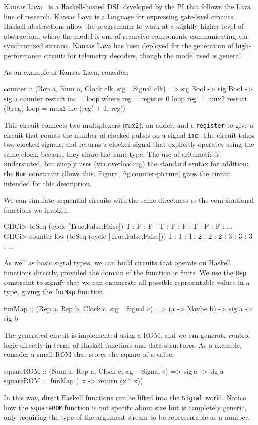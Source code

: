 \documentclass[11pt]{article}
\begin{document}
Kansas Lava~\cite{Gill:13:TypesKansasLava} is a Haskell-hosted DSL developed by the PI
that follows the Lava line of research.
Kansas Lava is a language for expressing gate-level circuits.
Haskell abstractions allow the programmer to work at
a slightly higher level of abstraction, where the model
is one of recursive components communicating via synchronized streams.
Kansas Lava has been deployed for the generation of high-performance circuits for telemetry decoders,
though the model used is general.

As an example of Kansas Lava, consider:

\begin{Code}

counter :: (Rep a, Num a, Clock clk, sig ~ Signal clk) => sig Bool -> sig Bool -> sig a
counter restart inc = loop
   where reg = register 0 loop
	 reg' = mux2 restart (0,reg)
	 loop = mux2 inc (reg' + 1, reg')
\end{Code}

This circuit connects two multiplexers (\verb|mux2|),
an adder,
and a \verb|register|
to give a circuit that counts the number of
clocked pulses on a signal \verb|inc|.
The circuit takes two clocked signals,
and returns a clocked signal that explicitly
operates using the same clock, because they
share the same type.
The use of arithmetic is understated,
but simply uses (via overloading) the
standard syntax for addition; the {\tt Num}
constraint allows this.
Figure~\ref{fig:counter-picture} gives the
circuit intended for this description.

We can simulate sequential circuits with the
same directness as the combinational functions we invoked.
\begin{Code}
GHCi> toSeq (cycle [True,False,False])
T : F : F : T : F : F : T : F : F : ...
GHCi> counter low (toSeq (cycle [True,False,False]))
1 : 1 : 1 : 2 : 2 : 2 : 3 : 3 : 3 : ...
\end{Code}

As well as basic signal types,
we can build circuits that operate on Haskell
functions directly, provided the domain of the
function is finite. We use the \verb|Rep|
constraint to signify that we can enumerate
all possible representable values in a type,
giving the \verb|funMap| function.
\begin{Code}
funMap :: (Rep a, Rep b, Clock c, sig ~ Signal c) => (a -> Maybe b) -> sig a -> sig b
\end{Code}
The generated circuit is implemented using a ROM,
and we can generate control logic
directly in terms of Haskell functions
and data-structures. As a example, consider
a small ROM that stores the square of a
value.
\begin{Code}
squareROM :: (Num a, Rep a, Clock c, sig ~ Signal c) => sig a -> sig a
squareROM = funMap (\ x -> return (x * x))
\end{Code}
In this way, direct Haskell functions
can be lifted into the \verb|Signal| world.
Notice how the \verb|squareROM| function is
not specific about size but is
completely generic, only requiring the
type of the argument stream
to be representable as a number.
\end{document}
